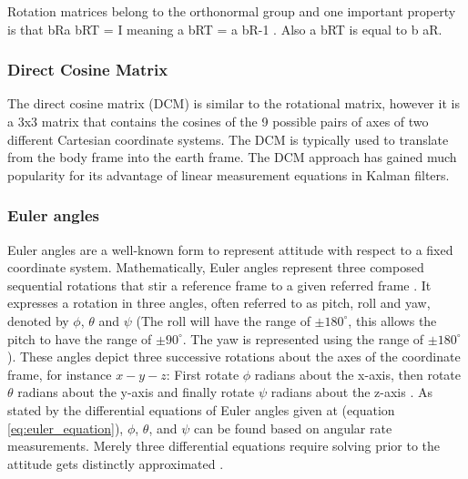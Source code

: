 Rotation matrices belong to the orthonormal group and one important property is that bRa bRT = I meaning a bRT = a bR-1 . Also a bRT is equal to b aR.

\subsubsection{Direct Cosine Matrix}

The direct cosine matrix (DCM) is similar to the rotational matrix, however it is a 3x3
matrix that contains the cosines of the 9 possible pairs of axes of two different Cartesian coordinate systems. The DCM is typically used to translate from the body frame into the earth frame. The DCM approach has gained much popularity for its advantage of
linear measurement equations in Kalman filters. \cite{premerlani2009direction}


\subsubsection{Euler angles}

Euler angles are a well-known form to represent attitude with respect to a fixed coordinate system. Mathematically, Euler angles represent three composed sequential rotations that stir a reference frame to a given referred frame \cite{diebel2006representing}. It expresses a rotation in three angles, often referred to as pitch, roll and yaw, denoted by $\phi$, $\theta$ and $\psi$ (The roll will have the range of $\pm180^\circ$, this allows the pitch to have the range of $\pm90^{\circ}$. The yaw is represented using the range of $\pm180^{\circ}$). These angles depict three successive rotations about the axes of the coordinate frame, for instance $x-y-z$: First rotate $\phi$ radians about the x-axis, then rotate $\theta$ radians about the y-axis and finally rotate $\psi$ radians about the z-axis \cite{grado1960solution}. As stated by the differential equations of Euler angles given at (equation \ref{eq:euler_equation}), $\phi$, $\theta$, and $\psi$ can be found based on angular rate measurements. Merely three differential equations require solving prior to the attitude gets distinctly approximated \cite{bar1985attitude}.



